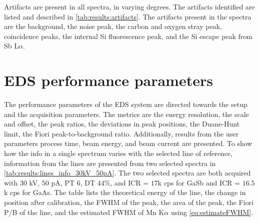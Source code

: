 Artifacts are present in all spectra, in varying degrees.
The artifacts identified are listed and described in \cref{tab:results:artifacts}.
The artifacts present in the spectra are the background, the noise peak, the carbon and oxygen stray peak, coincidence peaks, the internal Si fluorescence peak, and the Si escape peak from Sb L$\alpha$.


























\clearpage


\section{EDS performance parameters}
\label{results:performance}

The performance parameters of the EDS system are directed towards the setup and the acquisition parameters.
The metrics are the energy resolution, the scale and offset, the peak ratios, the deviations in peak positions, the Duane-Hunt limit, the Fiori peak-to-background ratio.
Additionally, results from the user parameters process time, beam energy, and beam current are presented.
To show how the info in a single spectrum varies with the selected line of reference, information from the lines are presented from two selected spectra in \cref{tab:results:lines_info_30kV_50pA}.
The two selected spectra are both acquired with $30$ kV, $50$ pA, PT $6$, DT $44$\%, and ICR = $17$k cps for GaSb and ICR = $16.5$k cps for GaAs.
The table lists the theoretical energy of the line, the change in position after calibration, the FWHM of the peak, the area of the peak, the Fiori P/B of the line, and the estimated FWHM of Mn K$\alpha$ using \cref{eq:estimateFWHM}.



